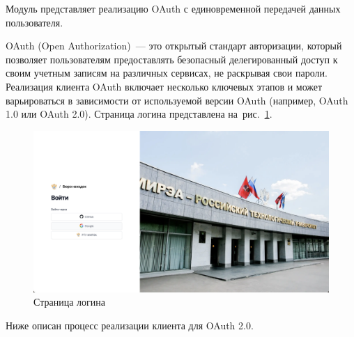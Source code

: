 Модуль представляет реализацию OAuth с единовременной передачей данных пользователя.

OAuth (Open Authorization)~--- это открытый стандарт авторизации, который позволяет пользователям предоставлять безопасный делегированный доступ к своим учетным записям на различных сервисах, не раскрывая свои пароли. Реализация клиента OAuth включает несколько ключевых этапов и может варьироваться в зависимости от используемой версии OAuth (например, OAuth 1.0 или OAuth 2.0). Страница логина представлена на~рис.~\ref{fig:login-page}.

\begin{figure}[htb]
	\centering
	\includegraphics[width=.95\textwidth]{images/login-page.png}
	\parskip=6pt
	\caption{Страница логина}
	\label{fig:login-page}
\end{figure}

Ниже описан процесс реализации клиента для OAuth 2.0.

